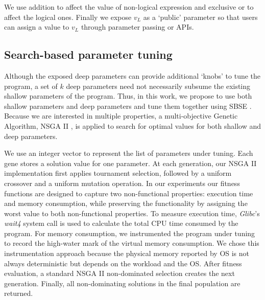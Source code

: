 We use addition to affect the value of non-logical expression and exclusive or to affect the logical ones.
Finally we expose $v_L$ as a `public' parameter so that users can assign a value to $v_L$ through parameter passing or APIs.

\subsection{Search-based parameter tuning}
\label{sec_nsgaii}

Although the exposed deep parameters can provide additional `knobs' \cite{Hoffmann:2011:DKR:1950365.1950390} to tune the program, a set of $k$ deep parameters need not necessarily subsume the existing shallow parameters of the program.  Thus, in this work, we propose to use both shallow parameters and deep parameters and tune them together using SBSE \cite{Harman:2007:CSF:1253532.1254729}. Because we are interested in multiple properties, a multi-objective Genetic Algorithm, NSGA II \cite{996017}, is applied to search for optimal values for both shallow and deep parameters.

We use an integer vector to represent the list of parameters under tuning. Each gene stores a solution value for one parameter. At each generation, our NSGA II implementation first applies tournament selection, followed by a uniform crossover and a uniform mutation operation. In our experiments our fitness functions are designed to capture two non-functional properties: execution time and memory consumption, while preserving the functionality by assigning the worst value to both non-functional properties. To measure execution time, \emph{Glibc}'s \emph{wait4} system call is used to calculate the total CPU time consumed by the program. For memory consumption, we instrumented the program under tuning to record the high-water mark of the virtual memory consumption. We chose this instrumentation approach because the physical memory reported by OS is not always deterministic but depends on the workload and the OS. After fitness evaluation, a standard NSGA II non-dominated selection creates the next generation. Finally, all non-dominating solutions in the final population are returned.

